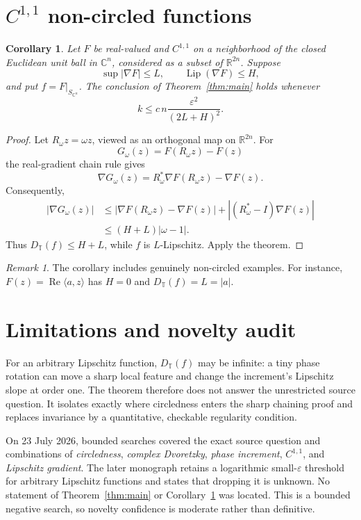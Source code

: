 \documentclass[11pt]{article}
\newtheorem{corollary}[theorem]{Corollary}
\theoremstyle{remark}
\newtheorem{remark}[theorem]{Remark}
\newcommand{\C}{\mathbb C}
\newcommand{\R}{\mathbb R}
\newcommand{\T}{\mathbb T}
\newcommand{\Lip}{\operatorname{Lip}}
\begin{document}
\section{\texorpdfstring{\(C^{1,1}\)}{C1,1} non-circled functions}

\begin{corollary}\label{cor:c11}
Let \(F\) be real-valued and \(C^{1,1}\) on a neighborhood of the closed
Euclidean unit ball in \(\C^n\), considered as a subset of \(\R^{2n}\).
Suppose
\[
 \sup|\nabla F|\leq L,\qquad \Lip(\nabla F)\leq H,
\]
and put \(f=F|_{S_{\C^n}}\).  The conclusion of
Theorem~\ref{thm:main} holds whenever
\[
 k\leq c\,n\frac{\varepsilon^2}{(2L+H)^2}.
\]
\end{corollary}

\begin{proof}
Let \(R_\omega z=\omega z\), viewed as an orthogonal map on \(\R^{2n}\).
For
\[
 G_\omega(z)=F(R_\omega z)-F(z)
\]
the real-gradient chain rule gives
\[
 \nabla G_\omega(z)
 =R_\omega^*\nabla F(R_\omega z)-\nabla F(z).
\]
Consequently,
\begin{align*}
 |\nabla G_\omega(z)|
 &\leq|\nabla F(R_\omega z)-\nabla F(z)|
      +|(R_\omega^*-I)\nabla F(z)|\\
 &\leq (H+L)|\omega-1|.
\end{align*}
Thus \(D_{\T}(f)\leq H+L\), while \(f\) is \(L\)-Lipschitz.  Apply the
theorem.
\end{proof}

\begin{remark}
The corollary includes genuinely non-circled examples.  For instance,
\(F(z)=\operatorname{Re}\langle a,z\rangle\) has \(H=0\) and
\(D_{\T}(f)=L=|a|\).
\end{remark}

\section{Limitations and novelty audit}

For an arbitrary Lipschitz function, \(D_{\T}(f)\) may be infinite: a tiny
phase rotation can move a sharp local feature and change the increment's
Lipschitz slope at order one.  The theorem therefore does not answer the
unrestricted source question.  It isolates exactly where circledness enters
the sharp chaining proof and replaces invariance by a quantitative,
checkable regularity condition.

On 23 July 2026, bounded searches covered the exact source question and
combinations of \emph{circledness}, \emph{complex Dvoretzky},
\emph{phase increment}, \(C^{1,1}\), and \emph{Lipschitz gradient}.  The
later monograph \cite{ABMB} retains a logarithmic small-\(\varepsilon\)
threshold for arbitrary Lipschitz functions and states that dropping it is
unknown.  No statement of Theorem~\ref{thm:main} or
Corollary~\ref{cor:c11} was located.  This is a bounded negative search, so
novelty confidence is moderate rather than definitive.
\end{document}
